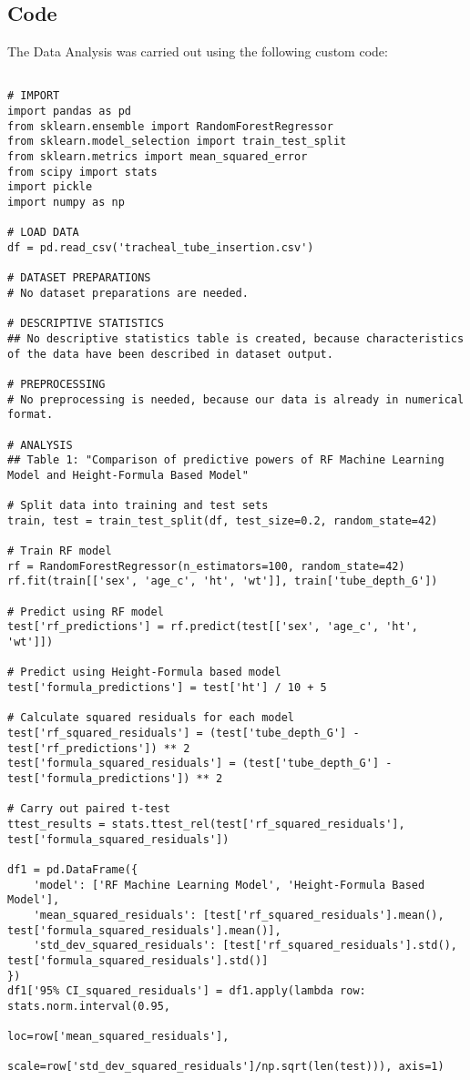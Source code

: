 \documentclass[11pt]{article}
\begin{document}
\subsection{{Code}}
The Data Analysis was carried out using the following custom code:

\begin{verbatim}

# IMPORT
import pandas as pd
from sklearn.ensemble import RandomForestRegressor
from sklearn.model_selection import train_test_split
from sklearn.metrics import mean_squared_error
from scipy import stats
import pickle
import numpy as np

# LOAD DATA
df = pd.read_csv('tracheal_tube_insertion.csv')

# DATASET PREPARATIONS
# No dataset preparations are needed.

# DESCRIPTIVE STATISTICS
## No descriptive statistics table is created, because characteristics of the data have been described in dataset output.

# PREPROCESSING 
# No preprocessing is needed, because our data is already in numerical format.

# ANALYSIS
## Table 1: "Comparison of predictive powers of RF Machine Learning Model and Height-Formula Based Model"

# Split data into training and test sets
train, test = train_test_split(df, test_size=0.2, random_state=42)

# Train RF model
rf = RandomForestRegressor(n_estimators=100, random_state=42)
rf.fit(train[['sex', 'age_c', 'ht', 'wt']], train['tube_depth_G'])

# Predict using RF model
test['rf_predictions'] = rf.predict(test[['sex', 'age_c', 'ht', 'wt']])

# Predict using Height-Formula based model
test['formula_predictions'] = test['ht'] / 10 + 5

# Calculate squared residuals for each model
test['rf_squared_residuals'] = (test['tube_depth_G'] - test['rf_predictions']) ** 2
test['formula_squared_residuals'] = (test['tube_depth_G'] - test['formula_predictions']) ** 2

# Carry out paired t-test
ttest_results = stats.ttest_rel(test['rf_squared_residuals'], test['formula_squared_residuals'])

df1 = pd.DataFrame({
    'model': ['RF Machine Learning Model', 'Height-Formula Based Model'],
    'mean_squared_residuals': [test['rf_squared_residuals'].mean(), test['formula_squared_residuals'].mean()],
    'std_dev_squared_residuals': [test['rf_squared_residuals'].std(), test['formula_squared_residuals'].std()]
})
df1['95% CI_squared_residuals'] = df1.apply(lambda row: stats.norm.interval(0.95, 
                                                                            loc=row['mean_squared_residuals'], 
                                                                            scale=row['std_dev_squared_residuals']/np.sqrt(len(test))), axis=1)


\end{verbatim}
\end{document}

